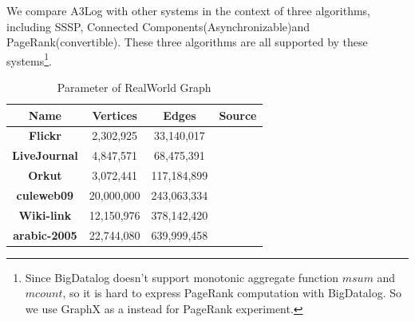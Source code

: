 We compare A3Log with other systems in the context of three algorithms, including SSSP, Connected Components(Asynchronizable)and PageRank(convertible). These three algorithms are all supported by these systems\footnote{Since BigDatalog doesn't support monotonic aggregate function $msum$ and $mcount$, so it is hard to express PageRank computation with BigDatalog. So we use GraphX as a instead for PageRank experiment.}.
\begin{table}[!t]
	\caption{Parameter of RealWorld Graph }
	\hspace{-0.15in}
	\vspace{0.0in}
	\label{tab:Dataset}
	\centering
	\small
	\begin{tabular}{c|c|c|c}
		\hline\hline
		{\textbf{Name}} &
		{\textbf{Vertices}} &
		{\textbf{Edges}} &
		{\textbf{Source}} \\
		\hline
		{\textbf{Flickr}} & 2,302,925 &33,140,017   & \cite{mislove-2008-flickr}\\
		\hline
		{\textbf{LiveJournal}} & 4,847,571 & 68,475,391 &\cite{livejournal}\\
		\hline
		{\textbf{Orkut}} &3,072,441& 117,184,899 & \cite{mislove-2007-socialnetworks} \\
		\hline
		{\textbf{culeweb09}} & 20,000,000 & 243,063,334 &\cite{clueweb}\\		\hline
		{\textbf{Wiki-link}} & 12,150,976 &378,142,420&\cite{wikilinks} \\
		\hline
		{\textbf{arabic-2005}} & 22,744,080 & 639,999,458 &\cite{arabic-2005}\\		\hline
		\hline
	\end{tabular}
	\vspace{-0.1in}
	
\end{table}
